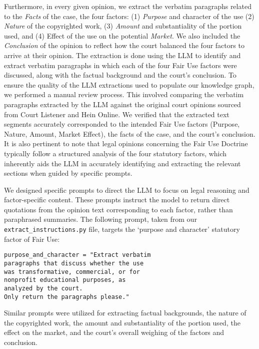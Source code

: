 Furthermore, in every given opinion, we extract the verbatim paragraphs related to the \textit{Facts} of the case, the four factors: (1) \textit{Purpose} and character of the use (2) \textit{Nature} of the copyrighted work, (3) \textit{Amount} and substantiality of the portion used, and (4) Effect of the use on the potential \textit{Market}. We also included the \textit{Conclusion} of the opinion to reflect how the court balanced the four factors to arrive at their opinion. The extraction is done using the LLM to identify and extract verbatim paragraphs in which each of the four Fair Use factors were discussed, along with the factual background and the court's conclusion. To ensure the quality of the LLM extractions used to populate our knowledge graph, we performed a manual review process. This involved comparing the verbatim paragraphs extracted by the LLM against the original court opinions sourced from Court Listener and Hein Online. We verified that the extracted text segments accurately corresponded to the intended Fair Use factors (Purpose, Nature, Amount, Market Effect), the facts of the case, and the court's conclusion. It is also pertinent to note that legal opinions concerning the Fair Use Doctrine typically follow a structured analysis of the four statutory factors, which inherently aids the LLM in accurately identifying and extracting the relevant sections when guided by specific prompts.

We designed specific prompts to direct the LLM to focus on legal reasoning and factor-specific content. These prompts instruct the model to return direct quotations from the opinion text corresponding to each factor, rather than paraphrased summaries. The following prompt, taken from our \texttt{extract\_instructions.py} file, targets the `purpose and character' statutory factor of Fair Use:

\begin{verbatim}
purpose_and_character = "Extract verbatim 
paragraphs that discuss whether the use 
was transformative, commercial, or for 
nonprofit educational purposes, as
analyzed by the court. 
Only return the paragraphs please."
\end{verbatim}

\noindent
Similar prompts were utilized for extracting factual backgrounds, the nature of the copyrighted work, the amount and substantiality of the portion used, the effect on the market, and the court's overall weighing of the factors and conclusion.

